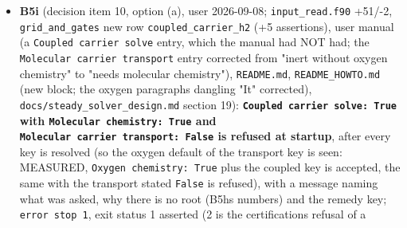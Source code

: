 \documentclass[english,a4paper]{my_memo}
\begin{document}
\begin{itemize}
  root a stationary residual may land on, or a statement that the front is
  unresolved on this grid), reported. The element solve with H2 carried
  then meets B5g\textquotesingle s carrier obstruction (\texttt{\textbar{}\textbar{}R\textbar{}\textbar{}} flat at 1.986 over 19
  iterations, carrier row 0.91, run stopped by PID at 4 min an iteration).
  Also MEASURED: \texttt{eq\_sweep\_reltol} below \textasciitilde1e-10 is unreachable by
  construction, the increment measure \texttt{max\textbar{}df\textbar{}/max(\textbar{}f\textbar{},1e-12)} reporting
  round-off of He I and H2+ fractions \textasciitilde1e-20 in the ionized wind (plateau
  6e-11 for sixty passes), which is what B5f\textquotesingle s and B5g\textquotesingle s "never met at
  1e-12, 1e-14" was. Tests: assertion 4 \texttt{residual\_is\_one\_number\_for\_basin}
  RED 3.155e-3 with H2 eliminated, GREEN 9.736e-10 with H2 carried (the
  tolerance read from the run\textquotesingle s own log); \texttt{steady\_species\_rows} 86/0 with
  the self-test pair; B5g\textquotesingle s part 1 reproduced as a by-product. A defect of
  the item\textquotesingle s own fixed inside it (a cell-report default of -1 was the lower
  ghost). \textbf{Decision put to the user as item 10}: refuse \texttt{Coupled\ carrier\ solve:\ True} on a molecular configuration without carrier transport, or
  turn the transport on for it (\texttt{input\_read.f90}, not the item\textquotesingle s).
\item
  \textbf{B5i} (decision item 10, option (a), user 2026-09-08; \texttt{input\_read.f90}
  +51/-2, \texttt{grid\_and\_gates} new row \texttt{coupled\_carrier\_h2} (+5 assertions),
  user manual (a \texttt{Coupled\ carrier\ solve} entry, which the manual had NOT
  had; the \texttt{Molecular\ carrier\ transport} entry corrected from "inert
  without oxygen chemistry" to "needs molecular chemistry"), \texttt{README.md},
  \texttt{README\_HOWTO.md} (new block; the oxygen paragraph\textquotesingle s dangling "It"
  corrected), \texttt{docs/steady\_solver\_design.md} section 19): \textbf{\texttt{Coupled\ carrier\ solve:\ True} with \texttt{Molecular\ chemistry:\ True} and \texttt{Molecular\ carrier\ transport:\ False} is refused at startup}, after every key is
  resolved (so the oxygen default of the transport key is seen: MEASURED,
  \texttt{Oxygen\ chemistry:\ True} plus the coupled key is accepted, the same with
  the transport stated \texttt{False} is refused), with a message naming what was
  asked, why there is no root (B5h\textquotesingle s numbers) and the remedy key; \texttt{error\ stop\ 1}, exit status 1 asserted (2 is the certification\textquotesingle s refusal of a

\end{itemize}
\end{document}
